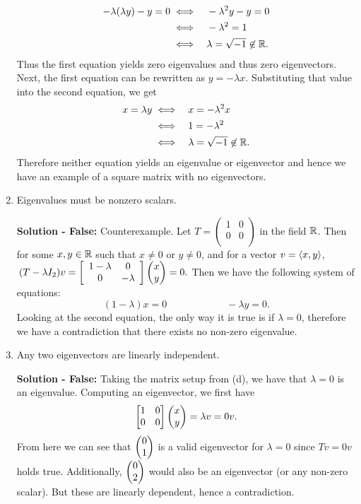 \begin{enumerate}
\begin{mybox}
          \begin{align*}
            -\lambda(\lambda y) - y = 0
            \iff & \quad -\lambda^2 y - y = 0 \\
            \iff & \quad -\lambda^2 = 1\\
            \iff & \quad \lambda = \sqrt{-1} \not \in \mathbb{R}.
          \end{align*}
          Thus the first equation yields zero eigenvalues and thus zero eigenvectors. Next, the first equation can be rewritten as $y = -\lambda x$. Substituting that value into the second equation, we get
          \begin{align*}
            x=\lambda y
            \iff & \quad x = -\lambda^2 x \\
            \iff & \quad 1 = -\lambda^2\\
            \iff & \quad \lambda = \sqrt{-1} \not \in \mathbb{R}.
          \end{align*}
          Therefore neither equation yields an eigenvalue or eigenvector and hence we have an example of a square matrix with no eigenvectors.
    \end{mybox}


    \item Eigenvalues must be nonzero scalars.
    \begin{mybox}
        \textbf{Solution - False: } Counterexample. Let $T = \left(
            \begin{array}{cc}
              1 & 0  \\
              0 & 0 \\
            \end{array}
          \right)$ in the field $\mathbb{R}$. Then for some $x,y \in \mathbb{R}$ such that $x \neq 0 \text{ or } y \neq 0$, and for a vector  $v = \left\langle{x,y}\right\rangle$, $\,(T-\lambda I_2)v = \left[ { \begin{array}{cc}
            1 -\lambda & 0  \\
            0 & -\lambda \\
          \end{array}} \right] \begin{pmatrix}{x}\\{y}\end{pmatrix} = 0.$ Then we have the following system of equations:
          $$(1 -\lambda) x = 0 \hspace{1in} - \lambda y = 0.$$
          Looking at the second equation, the only way it is true is if $\lambda = 0$, therefore we have a contradiction that there exists no non-zero eigenvalue.
    \end{mybox}

    \newpage
    \item Any two eigenvectors are linearly independent.
    \begin{mybox}
        \textbf{Solution - False: } Taking the matrix setup from (d), we have that $\lambda = 0$ is an eigenvalue. Computing an eigenvector, we first have
        $$\begin{bmatrix}{1} & {0}\\{0}&{0}\end{bmatrix} \begin{pmatrix}{x}\\{y}\end{pmatrix} = \lambda v = 0v.$$
        From here we can see that $\begin{pmatrix}{0}\\{1}\end{pmatrix}$ is a valid eigenvector for $\lambda = 0$ since $Tv = 0v$ holds true. Additionally, $\begin{pmatrix}{0}\\{2}\end{pmatrix}$ would also be an eigenvector (or any non-zero scalar). But these are linearly dependent, hence a contradiction.
    \end{mybox}




\end{enumerate}
